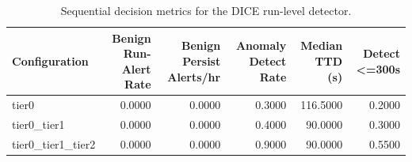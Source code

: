 \begin{table}[t]
\centering
\caption{Sequential decision metrics for the DICE run-level detector.}
\label{tab:dice_sequential_metrics}
\footnotesize
\begin{tabular}{lrrrrr}
\toprule
Configuration & Benign Run-Alert Rate & Benign Persist Alerts/hr & Anomaly Detect Rate & Median TTD (s) & Detect <=300s \\
\midrule
tier0 & 0.0000 & 0.0000 & 0.3000 & 116.5000 & 0.2000 \\
tier0_tier1 & 0.0000 & 0.0000 & 0.4000 & 90.0000 & 0.3000 \\
tier0_tier1_tier2 & 0.0000 & 0.0000 & 0.9000 & 90.0000 & 0.5500 \\
\bottomrule
\end{tabular}

\end{table}
